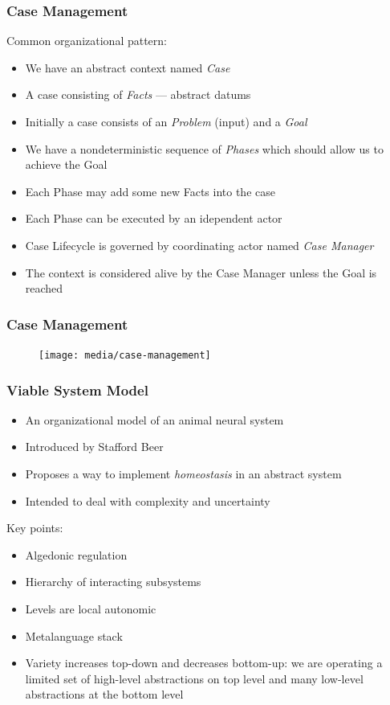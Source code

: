 \documentclass{beamer}
\begin{document}
\begin{frame}
    \frametitle{Case Management}

    Common organizational pattern:

    \begin{itemize}
        \item We have an abstract context named \textit{Case}
        \item A case consisting of \textit{Facts} --- abstract datums
        \item Initially a case consists of an \textit{Problem} (input) and a \textit{Goal}
        \item We have a nondeterministic sequence of \textit{Phases} which should allow us to achieve the Goal
        \item Each Phase may add some new Facts into the case
        \item Each Phase can be executed by an idependent actor
        \item Case Lifecycle is governed by coordinating actor named \textit{Case Manager}
        \item The context is considered alive by the Case Manager unless the Goal is reached
    \end{itemize}
\end{frame}

\begin{frame}
    \frametitle{Case Management}
    
    \begin{figure}
        \texttt{[image: media/case-management]}
    \end{figure}
\end{frame}

\begin{frame}
    \frametitle{Viable System Model}
    
\begin{itemize}
    \item An organizational model of an animal neural system
    \item Introduced by Stafford Beer
    \item Proposes a way to implement \textit{homeostasis} in an abstract system
    \item Intended to deal with complexity and uncertainty  
\end{itemize}

Key points:
\begin{itemize}
    \item Algedonic regulation
    \item Hierarchy of interacting subsystems
    \item Levels are local autonomic
    \item Metalanguage stack
    \item Variety increases top-down and decreases bottom-up: 
          we are operating a limited set of high-level abstractions on top level 
          and many low-level abstractions at the bottom level
\end{itemize}
\end{frame}
\end{document}
